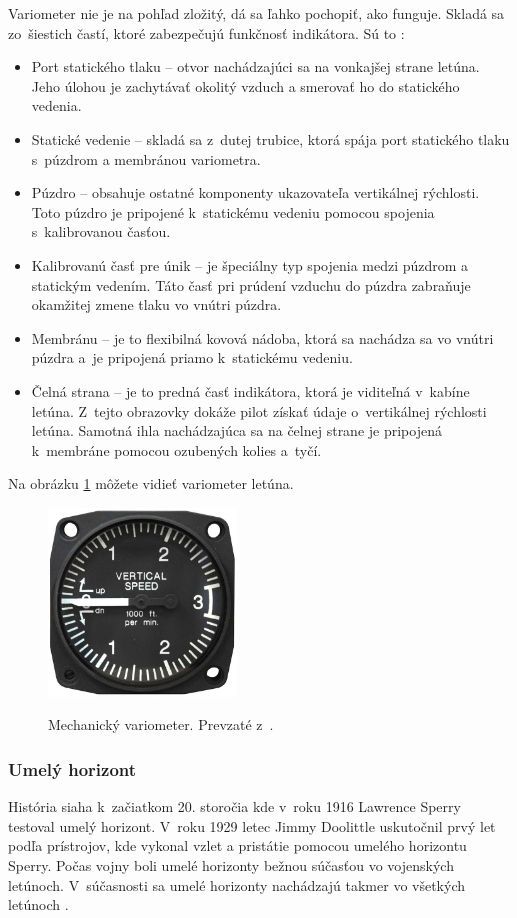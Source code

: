 Variometer nie je na pohľad zložitý, dá sa ľahko pochopiť, ako funguje. Skladá sa zo~šiestich častí, ktoré zabezpečujú funkčnosť indikátora. Sú to \cite{vsiAirspeed}:
\begin{itemize}
    \item Port statického tlaku – otvor nachádzajúci sa na vonkajšej strane letúna. Jeho úlohou je zachytávať okolitý vzduch a smerovať ho do statického vedenia.
    \item Statické vedenie – skladá sa z~dutej trubice, ktorá spája port statického tlaku s~púzdrom a membránou variometra.
    \item Púzdro – obsahuje ostatné komponenty ukazovateľa vertikálnej rýchlosti. Toto púzdro je pripojené k~statickému vedeniu pomocou spojenia s~kalibrovanou časťou.
    \item Kalibrovanú časť pre únik – je špeciálny typ spojenia medzi púzdrom a statickým vedením. Táto časť pri prúdení vzduchu do púzdra zabraňuje okamžitej zmene tlaku vo vnútri púzdra.
    \item Membránu – je to flexibilná kovová nádoba, ktorá sa nachádza sa vo vnútri púzdra a~je pripojená priamo k~statickému vedeniu. 
    \item Čelná strana – je to predná časť indikátora, ktorá je viditeľná v~kabíne letúna. Z~tejto obrazovky dokáže pilot získať údaje o~vertikálnej rýchlosti letúna. Samotná ihla nachádzajúca sa na čelnej strane je pripojená k~membráne pomocou ozubených kolies a~tyčí.
\end{itemize}
Na obrázku \ref{VSI} môžete vidieť variometer letúna.
\begin{figure}[ht]
\centering
\includegraphics[height=5cm, width=5cm]{obrazky-figures/variometer.png}
\caption{Mechanický variometer. Prevzaté z~\cite{fotoIndikator}.}{\label{VSI}}
\end{figure}
\newpage
\bigskip
\subsubsection{Umelý horizont}
História siaha k~začiatkom 20. storočia kde v~roku 1916 Lawrence Sperry testoval umelý horizont. V~roku 1929 letec Jimmy Doolittle uskutočnil prvý let podľa prístrojov, kde vykonal vzlet a pristátie pomocou umelého horizontu Sperry. Počas vojny boli umelé horizonty bežnou súčasťou vo vojenských letúnoch. V~súčasnosti sa umelé horizonty nachádzajú takmer vo všetkých letúnoch \cite{gyroscopeHistory}.


